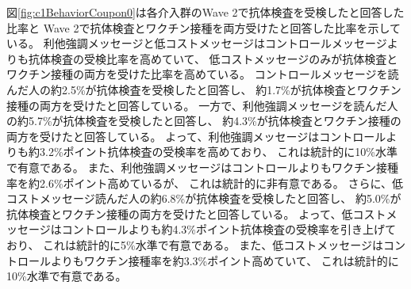 \documentclass[
  11pt,
  a4paper,
]{article}
\begin{document}
図\ref{fig:c1BehaviorCoupon0}は各介入群のWave 2で抗体検査を受検したと回答した比率と
Wave 2で抗体検査とワクチン接種を両方受けたと回答した比率を示している。
利他強調メッセージと低コストメッセージはコントロールメッセージよりも抗体検査の受検比率を高めていて、
低コストメッセージのみが抗体検査とワクチン接種の両方を受けた比率を高めている。
コントロールメッセージを読んだ人の約2.5\%が抗体検査を受検したと回答し、
約1.7\%が抗体検査とワクチン接種の両方を受けたと回答している。
一方で、利他強調メッセージを読んだ人の約5.7\%が抗体検査を受検したと回答し、
約4.3\%が抗体検査とワクチン接種の両方を受けたと回答している。
よって、利他強調メッセージはコントロールよりも約3.2\%ポイント抗体検査の受検率を高めており、
これは統計的に10\%水準で有意である。
また、利他強調メッセージはコントロールよりもワクチン接種率を約2.6\%ポイント高めているが、
これは統計的に非有意である。
さらに、低コストメッセージ読んだ人の約6.8\%が抗体検査を受検したと回答し、
約5.0\%が抗体検査とワクチン接種の両方を受けたと回答している。
よって、低コストメッセージはコントロールよりも約4.3\%ポイント抗体検査の受検率を引き上げており、
これは統計的に5\%水準で有意である。
また、低コストメッセージはコントロールよりもワクチン接種率を約3.3\%ポイント高めていて、
これは統計的に10\%水準で有意である。
\end{document}
